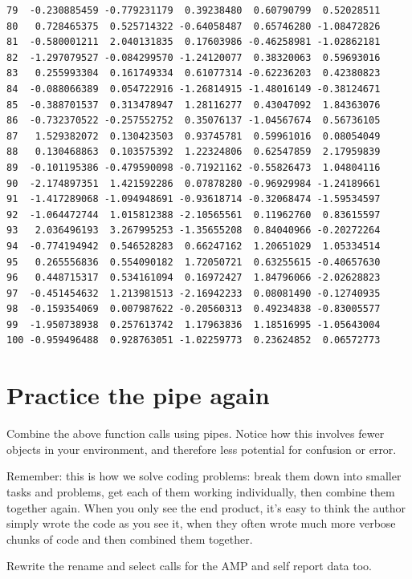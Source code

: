 \documentclass[
  letterpaper,
  DIV=11,
  numbers=noendperiod]{scrreprt}
\begin{document}
\begin{verbatim}
79  -0.230885459 -0.779231179  0.39238480  0.60790799  0.52028511
80   0.728465375  0.525714322 -0.64058487  0.65746280 -1.08472826
81  -0.580001211  2.040131835  0.17603986 -0.46258981 -1.02862181
82  -1.297079527 -0.084299570 -1.24120077  0.38320063  0.59693016
83   0.255993304  0.161749334  0.61077314 -0.62236203  0.42380823
84  -0.088066389  0.054722916 -1.26814915 -1.48016149 -0.38124671
85  -0.388701537  0.313478947  1.28116277  0.43047092  1.84363076
86  -0.732370522 -0.257552752  0.35076137 -1.04567674  0.56736105
87   1.529382072  0.130423503  0.93745781  0.59961016  0.08054049
88   0.130468863  0.103575392  1.22324806  0.62547859  2.17959839
89  -0.101195386 -0.479590098 -0.71921162 -0.55826473  1.04804116
90  -2.174897351  1.421592286  0.07878280 -0.96929984 -1.24189661
91  -1.417289068 -1.094948691 -0.93618714 -0.32068474 -1.59534597
92  -1.064472744  1.015812388 -2.10565561  0.11962760  0.83615597
93   2.036496193  3.267995253 -1.35655208  0.84040966 -0.20272264
94  -0.774194942  0.546528283  0.66247162  1.20651029  1.05334514
95   0.265556836  0.554090182  1.72050721  0.63255615 -0.40657630
96   0.448715317  0.534161094  0.16972427  1.84796066 -2.02628823
97  -0.451454632  1.213981513 -2.16942233  0.08081490 -0.12740935
98  -0.159354069  0.007987622 -0.20560313  0.49234838 -0.83005577
99  -1.950738938  0.257613742  1.17963836  1.18516995 -1.05643004
100 -0.959496488  0.928763051 -1.02259773  0.23624852  0.06572773
\end{verbatim}

\section{Practice the pipe again}\label{practice-the-pipe-again}

Combine the above function calls using pipes. Notice how this involves
fewer objects in your environment, and therefore less potential for
confusion or error.

Remember: this is how we solve coding problems: break them down into
smaller tasks and problems, get each of them working individually, then
combine them together again. When you only see the end product, it's
easy to think the author simply wrote the code as you see it, when they
often wrote much more verbose chunks of code and then combined them
together.

Rewrite the rename and select calls for the AMP and self report data
too.
\end{document}
